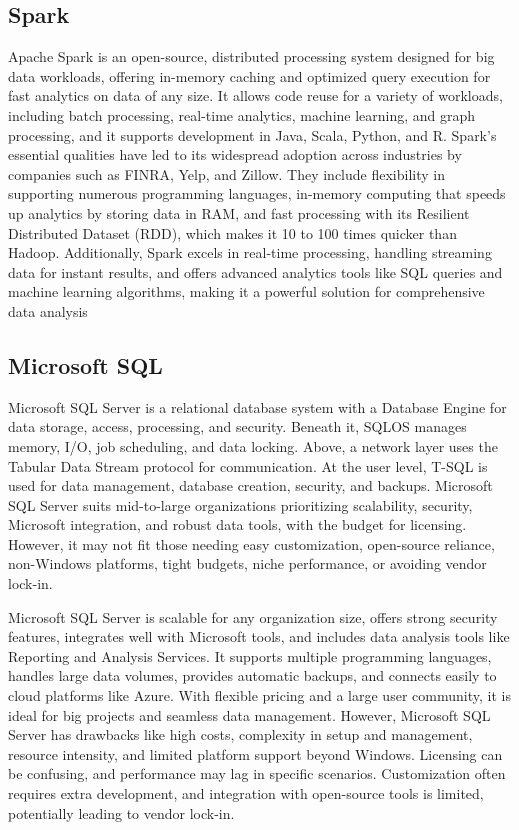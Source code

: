     \subsection{Spark}
    Apache Spark is an open-source, distributed processing system designed for big data workloads, offering in-memory caching and optimized query execution for fast analytics on data of any size. It allows code reuse for a variety of workloads, including batch processing, real-time analytics, machine learning, and graph processing, and it supports development in Java, Scala, Python, and R. Spark's essential qualities have led to its widespread adoption across industries by companies such as FINRA, Yelp, and Zillow. They include flexibility in supporting numerous programming languages, in-memory computing that speeds up analytics by storing data in RAM, and fast processing with its Resilient Distributed Dataset (RDD), which makes it 10 to 100 times quicker than Hadoop. Additionally, Spark excels in real-time processing, handling streaming data for instant results, and offers advanced analytics tools like SQL queries and machine learning algorithms, making it a powerful solution for comprehensive data analysis
    \cite{Joseph}
    \subsection{Microsoft SQL}
    Microsoft SQL Server is a relational database system with a Database Engine for data storage, access, processing, and security. Beneath it, SQLOS manages memory, I/O, job scheduling, and data locking. Above, a network layer uses the Tabular Data Stream protocol for communication. At the user level, T-SQL is used for data management, database creation, security, and backups. Microsoft SQL Server suits mid-to-large organizations prioritizing scalability, security, Microsoft integration, and robust data tools, with the budget for licensing. However, it may not fit those needing easy customization, open-source reliance, non-Windows platforms, tight budgets, niche performance, or avoiding vendor lock-in.

    Microsoft SQL Server is scalable for any organization size, offers strong security features, integrates well with Microsoft tools, and includes data analysis tools like Reporting and Analysis Services. It supports multiple programming languages, handles large data volumes, provides automatic backups, and connects easily to cloud platforms like Azure. With flexible pricing and a large user community, it is ideal for big projects and seamless data management. However, Microsoft SQL Server has drawbacks like high costs, complexity in setup and management, resource intensity, and limited platform support beyond Windows. Licensing can be confusing, and performance may lag in specific scenarios. Customization often requires extra development, and integration with open-source tools is limited, potentially leading to vendor lock-in.
    \cite{XTIVIA}


